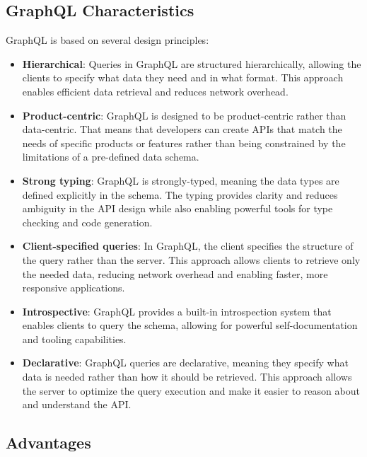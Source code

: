 \subsection{GraphQL Characteristics}\label{subsection:background:graphql:graphql-characteristics}

GraphQL is based on several design principles: \cite{misc:-:background:graphql:graphql-specification}

\begin{itemize}
    \item \textbf{Hierarchical}: Queries in GraphQL are structured hierarchically, allowing the clients to specify what data they need and in what format. This approach enables efficient data retrieval and reduces network overhead.

    \item \textbf{Product-centric}: GraphQL is designed to be product-centric rather than data-centric. That means that developers can create \acp{API} that match the needs of specific products or features rather than being constrained by the limitations of a pre-defined data schema.

    \item \textbf{Strong typing}: GraphQL is strongly-typed, meaning the data types are defined explicitly in the schema. The typing provides clarity and reduces ambiguity in the \ac{API} design while also enabling powerful tools for type checking and code generation.

    \item \textbf{Client-specified queries}: In GraphQL, the client specifies the structure of the query rather than the server. This approach allows clients to retrieve only the needed data, reducing network overhead and enabling faster, more responsive applications.

    \item \textbf{Introspective}: GraphQL provides a built-in introspection system that enables clients to query the schema, allowing for powerful self-documentation and tooling capabilities.

    \item \textbf{Declarative}: GraphQL queries are declarative, meaning they specify what data is needed rather than how it should be retrieved. This approach allows the server to optimize the query execution and make it easier to reason about and understand the \ac{API}.
\end{itemize}

\subsection{Advantages}\label{subsection:background:graphql:graphql-advantages}


